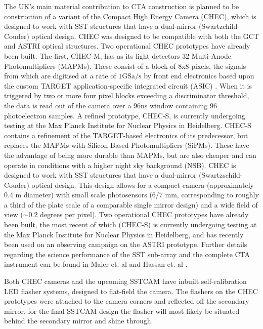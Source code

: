The UK's main material contribution to CTA construction is planned to be construction of a variant of the Compact High Energy Camera (CHEC), which is designed to work with SST structures that have a dual-mirror (Swartzchild-Couder) optical design. CHEC was designed to be compatible with both the GCT and ASTRI optical structures.  Two operational CHEC prototypes have already been built. The first, CHEC-M, has as its light detectors 32 Multi-Anode Photomultipliers (MAPMs)\cite{tomthesis}. These consist of a block of 8x8 pixels, the signals from which are digitised at a rate of $1\mathrm{GSa}/\mathrm{s}$ \cite{tomthesis} by front end electronics based upon the custom TARGET application-specific integrated circuit (ASIC) \cite{checmpaper}. When it is triggered by two or more four pixel blocks exceeding a discriminator threshold, the data is read out of the camera over a 96ns window containing 96 photoelectron samples. A refined prototype, CHEC-S, is currently undergoing testing at the Max Planck Institute for Nuclear Physics in Heidelberg. CHEC-S contains a refinement of the TARGET-based electronics of its predecessor, but replaces the MAPMs with Silicon Based Photomultipliers (SiPMs). These have the advantage of being more durable than MAPMs, but are also cheaper and can operate in conditions with a higher night sky background (NSB). CHEC is designed to work with SST structures that have a dual-mirror (Swartzschild-Couder) optical design. This design allows for a compact camera (approximately 0.4 m diameter) with small scale photosensors (6/7 mm, corresponding to roughly a third of the plate scale of a comparable single mirror design) and a wide field of view ($\sim$0.2 degrees per pixel). Two operational CHEC prototypes have already been built, the most recent of which (CHEC-S) is currently undergoing testing at the Max Planck Institute for Nuclear Physics in Heidelberg, and has recently been used on an observing campaign on the ASTRI prototype. Further details regarding the science performance of the SST sub-array and the complete CTA instrument can be found in Maier et. al \cite{gernotCTA} and Hassan et. al \cite{tarekCTA}.

Both CHEC cameras and the upcoming SSTCAM have inbuilt self-calibration LED flasher systems, designed to flat-field the camera. The flashers on the CHEC prototypes were attached to the camera corners and reflected off the secondary mirror, for the final SSTCAM design the flasher will most likely be situated behind the secondary mirror and shine through. 

